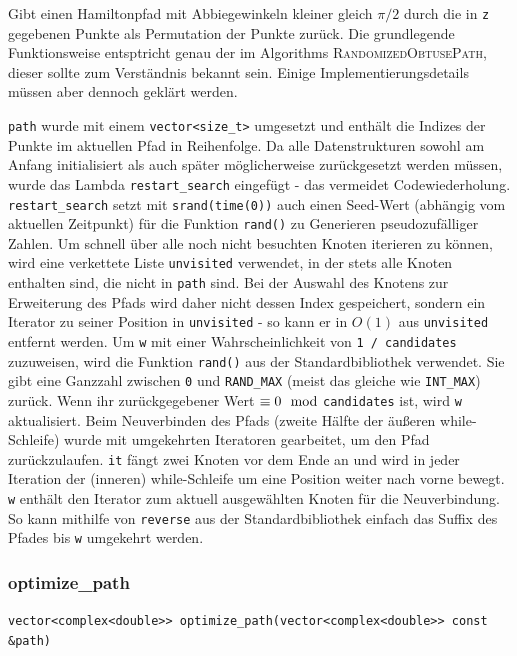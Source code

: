 \documentclass[a4paper, 10pt, ngerman]{article}
\begin{document}
\noindent Gibt einen Hamiltonpfad mit Abbiegewinkeln kleiner gleich $\pi / 2$ durch die in \verb|z| gegebenen Punkte als Permutation der Punkte zurück. Die grundlegende Funktionsweise entsptricht genau der im Algorithms \textsc{RandomizedObtusePath}, dieser sollte zum Verständnis bekannt sein. Einige Implementierungsdetails müssen aber dennoch geklärt werden.

\verb|path| wurde mit einem \verb|vector<size_t>| umgesetzt und enthält die Indizes der Punkte im aktuellen Pfad in Reihenfolge. Da alle Datenstrukturen sowohl am Anfang initialisiert als auch später möglicherweise zurückgesetzt werden müssen, wurde das Lambda \verb|restart_search| eingefügt - das vermeidet Codewiederholung. \verb|restart_search| setzt mit \verb|srand(time(0))| auch einen Seed-Wert (abhängig vom aktuellen Zeitpunkt) für die Funktion \verb|rand()| zu Generieren pseudozufälliger Zahlen. Um schnell über alle noch nicht besuchten Knoten iterieren zu können, wird eine verkettete Liste \verb|unvisited| verwendet, in der stets alle Knoten enthalten sind, die nicht in \verb|path| sind. Bei der Auswahl des Knotens zur Erweiterung des Pfads wird daher nicht dessen Index gespeichert, sondern ein Iterator zu seiner Position in \verb|unvisited| - so kann er in $O(1)$ aus \verb|unvisited| entfernt werden. Um \verb|w| mit einer Wahrscheinlichkeit von \verb|1 / candidates| zuzuweisen, wird die Funktion \verb|rand()| aus der Standardbibliothek verwendet. Sie gibt eine Ganzzahl zwischen \verb|0| und \verb|RAND_MAX| (meist das gleiche wie \verb|INT_MAX|) zurück. Wenn ihr zurückgegebener Wert $\equiv 0 \mod$\verb|candidates| ist, wird \verb|w| aktualisiert. Beim Neuverbinden des Pfads (zweite Hälfte der äußeren while-Schleife) wurde mit umgekehrten Iteratoren gearbeitet, um den Pfad zurückzulaufen. \verb|it| fängt zwei Knoten vor dem Ende an und wird in jeder Iteration der (inneren) while-Schleife um eine Position weiter nach vorne bewegt. \verb|w| enthält den Iterator zum aktuell ausgewählten Knoten für die Neuverbindung. So kann mithilfe von \verb|reverse| aus der Standardbibliothek einfach das Suffix des Pfades bis \verb|w| umgekehrt werden.

\subsubsection{optimize\_path}

\verb|vector<complex<double>> optimize_path(vector<complex<double>> const &path)|
\medskip
\end{document}
